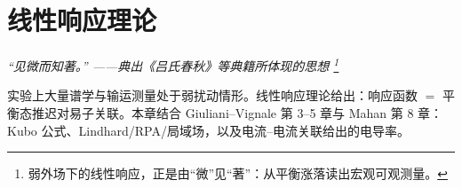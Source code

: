 \chapter{线性响应理论}
\renewcommand{\currentchapterpath}{chapters/ch05/}

\begin{flushright}
\textit{“见微而知著。” ——典出《吕氏春秋》等典籍所体现的思想
\footnote{弱外场下的线性响应，正是由“微”见“著”：从平衡涨落读出宏观可观测量。}}
\end{flushright}

实验上大量谱学与输运测量处于弱扰动情形。线性响应理论给出：响应函数 $=$ 平衡态推迟对易子关联。本章结合 Giuliani--Vignale 第 3--5 章与 Mahan 第 8 章：Kubo 公式、Lindhard/RPA/局域场，以及电流--电流关联给出的电导率。


